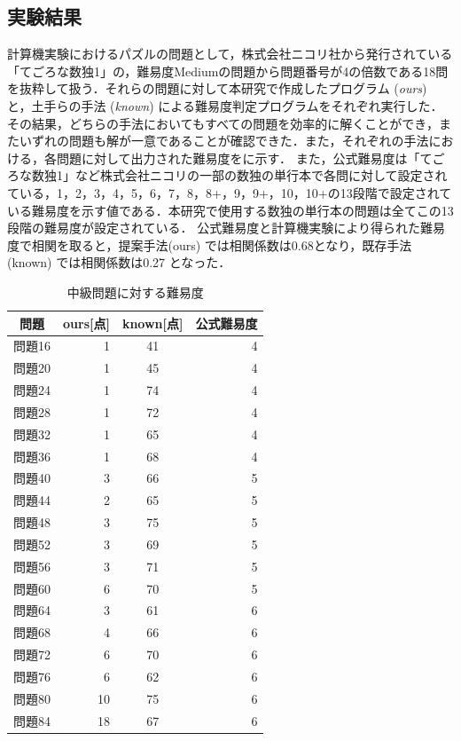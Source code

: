 \documentclass[submit,techrep,noauthor]{ipsj}
\begin{document}
\subsection{実験結果}
計算機実験におけるパズルの問題として，株式会社ニコリ社から発行されている「てごろな数独1」の，難易度Mediumの問題から問題番号が4の倍数である18問を抜粋して扱う\cite{てごろな数独1}．それらの問題に対して本研究で作成したプログラム (\emph{ours}) と，土手らの手法 (\emph{known}) による難易度判定プログラムをそれぞれ実行した．その結果，どちらの手法においてもすべての問題を効率的に解くことができ，またいずれの問題も解が一意であることが確認できた．また，それぞれの手法における，各問題に対して出力された難易度をに示す．
また，公式難易度は「てごろな数独1」など株式会社ニコリの一部の数独の単行本で各問に対して設定されている，1，2，3，4，5，6，7，8，8+，9，9+，10，10+の13段階で設定されている難易度を示す値である．本研究で使用する数独の単行本の問題は全てこの13段階の難易度が設定されている．
公式難易度と計算機実験により得られた難易度で相関を取ると，提案手法(ours) では相関係数は0.68となり，既存手法 (known) では相関係数は0.27 となった．
	\begin{table}[tb]
		\caption{中級問題に対する難易度}
		\label{study_medium}
			\begin{tabular}{crcr}
			\hline\hline
			問題 & ours[点] & known[点] & 公式難易度\\
			\hline
問題16 & 1 & 41 & 4\\
問題20 & 1 & 45 & 4\\
問題24 & 1 & 74 & 4\\
問題28 & 1 & 72 & 4\\
問題32 & 1 & 65 & 4\\
問題36 & 1 & 68 & 4\\
問題40 & 3 & 66 & 5\\
問題44 & 2 & 65 & 5\\
問題48 & 3 & 75 & 5\\
問題52 & 3 & 69 & 5\\
問題56 & 3 & 71 & 5\\
問題60 & 6 & 70 & 5\\
問題64 & 3 & 61 & 6\\
問題68 & 4 & 66 & 6\\
問題72 & 6 & 70 & 6\\
問題76 & 6 & 62 & 6\\
問題80 & 10 & 75 & 6\\
問題84 & 18 & 67 & 6\\
			\hline
	 	\end{tabular}
	\end{table}
\end{document}
